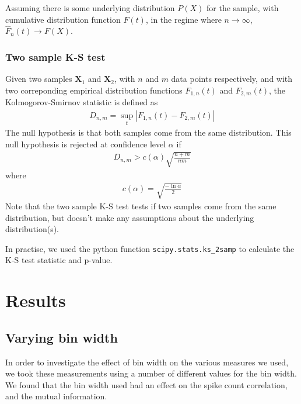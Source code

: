 \documentclass[a4paper,12pt]{article}
\theoremstyle{definition}
\begin{document}
Assuming there is some underlying distribution $P(X)$ for the sample, with cumulative distribution function $F(t)$, in the regime where $n \rightarrow \infty$, $\hat{F}_n (t) \rightarrow F(X)$.

\subsubsection{Two sample K-S test}
Given two samples $\mathbf{X}_1$ and $\mathbf{X}_2$, with $n$ and $m$ data points respectively, and with two correponding empirical distribution functions $F_{1,n}(t)$ and $F_{2,m}(t)$, the Kolmogorov-Smirnov statistic is defined as
\begin{align}
  D_{n,m} = \sup_{t} |F_{1,n}(t) - F_{2,m}(t)|
\end{align}
The null hypothesis is that both samples come from the same distribution. This null hypothesis is rejected at confidence level $\alpha$ if
\begin{align}
  D_{n,m} > c(\alpha)\sqrt{\frac{n+m}{nm}}
\end{align}
where
\begin{align}
  c(\alpha) = \sqrt{\frac{-\ln \alpha}{2}}
\end{align}
Note that the two sample K-S test tests if two samples come from the same distribution, but doesn't make any assumptions about the underlying distribution(s).

In practise, we used the python function \texttt{scipy.stats.ks\_2samp} to calculate the K-S test statistic and p-value.

\section{Results}
\subsection{Varying bin width}
In order to investigate the effect of bin width on the various measures we used, we took these measurements using a number of different values for the bin width. We found that the bin width used had an effect on the spike count correlation, and the mutual information.
\end{document}
